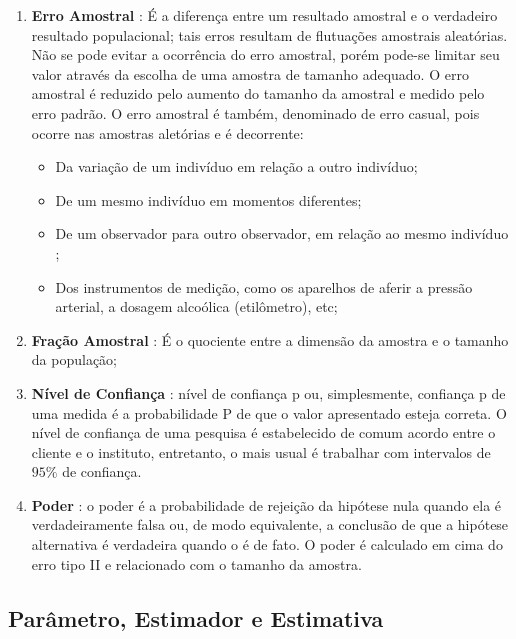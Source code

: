 \begin{enumerate}
\item \textbf{Erro Amostral} : É a diferença entre um resultado amostral e o verdadeiro resultado populacional; tais erros resultam de flutuações amostrais aleatórias. Não se pode evitar a ocorrência do erro amostral, porém pode-se limitar seu valor através da escolha de uma amostra de tamanho adequado. O erro amostral é reduzido pelo aumento do tamanho da amostral e medido pelo erro padrão. O erro amostral é também, denominado de erro casual, pois ocorre nas amostras aletórias e é decorrente:

\begin{itemize}
\item Da variação de um indivíduo em relação a outro indivíduo;
\item De um mesmo indivíduo em momentos diferentes;
\item De um observador para outro observador, em relação ao mesmo indivíduo ;
\item Dos instrumentos de medição, como os aparelhos de aferir a pressão arterial, a dosagem alcoólica (etilômetro), etc;
\end{itemize}


\item \textbf{Fração Amostral} : É o quociente entre a dimensão da
amostra e o tamanho da população; 
\item \textbf{Nível de
Confiança} : nível de confiança p ou, simplesmente, confiança p de
uma medida é a probabilidade P de que o valor apresentado esteja
correta. O nível de confiança de uma pesquisa é estabelecido de
comum acordo entre o cliente e o instituto, entretanto, o mais
usual é trabalhar com intervalos de $95\%$ de confiança.
\item \textbf{Poder} : o poder é a probabilidade de rejeição da hipótese nula quando ela é verdadeiramente falsa ou, de modo equivalente, a conclusão de que a hipótese alternativa é verdadeira quando o é de fato. O poder é calculado em cima do erro tipo II e relacionado com o tamanho da amostra.
\end{enumerate}




\subsection{Parâmetro, Estimador e Estimativa}

